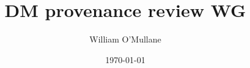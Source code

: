 \documentclass[DM,lsstdraft,toc]{lsstdoc}
\title{DM provenance review WG}
\author{%
William O'Mullane
}
\date{\today}
\begin{document}
\maketitle





\appendix
\label{sec:bib}


%
\label{sec:acronyms}
\printglossaries
\end{document}
